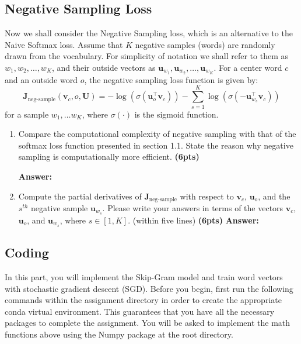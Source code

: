 \documentclass{assignment format}
\newenvironment{answer}{
    {\bf Answer:} \begingroup\color{red}
}{\endgroup}%
\begin{document}
\subsection{Negative Sampling Loss}
Now we shall consider the Negative Sampling loss, which is an alternative to the Naive Softmax loss.  Assume that $K$ negative samples (words) are randomly drawn from the vocabulary. For simplicity of notation we shall refer to them as $w_1, w_2, \dots, w_K$, and their outside vectors as $\bm u_{w_1}, \bm u_{w_2}, \dots, \bm u_{w_K}$. 
For a center word $c$ and an outside word $o$, the negative sampling loss function is given by:
\begin{equation}
\bm J_{\text{neg-sample}}(\bm v_c, o, \bm U) = -\log(\sigma(\bm u_o^\top \bm v_c)) - \sum_{s=1}^K \log(\sigma(-\bm u_{w_s}^\top \bm v_c))
\label{negsample}
\end{equation}
for a sample $w_1, \ldots w_K$, where $\sigma(\cdot)$ is the sigmoid function.
\begin{enumerate}[label=(\alph*)]
\item Compare the computational complexity of negative sampling with that of the softmax loss function presented in section 1.1. State the reason why negative sampling is computationally more efficient. \textbf{(6pts)}

\begin{answer}

    \end{answer}
\item Compute the partial derivatives of $\bm J_{\text{neg-sample}}$ with respect to $\bm v_c$, $\bm u_o$, and the $s^{th}$ negative sample $\bm u_{w_s}$. Please write your answers in terms of the vectors $\bm v_c$, $\bm u_o$, and $\bm u_{w_s}$, where $s \in [1, K]$.
 (within five lines)
\textbf{(6pts)}
\begin{answer}

    \end{answer}
\end{enumerate}
\subsection{Coding}
In this part, you will implement the Skip-Gram model and train word vectors with stochastic gradient descent (SGD). Before you begin, first run the following commands within the assignment directory in order to create the appropriate conda virtual environment. This guarantees that you have all the necessary packages to complete the assignment. You will be asked to implement the math functions above using the Numpy package at the root directory. 
\end{document}
